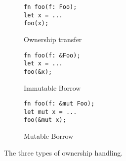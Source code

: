 \begin{figure}[ht]
  \begin{subfigure}{0.3\textwidth}
    \caption{Ownership transfer\label{fig:ownership-transfer}}
    \begin{lstlisting}
fn foo(f: Foo);
let x = ...
foo(x);\end{lstlisting}
  \end{subfigure}%
  \hfill
  \begin{subfigure}{0.3\textwidth}
    \caption{Immutable Borrow\label{fig:immutable-borrow}}
    \begin{lstlisting}
fn foo(f: &Foo);
let x = ...
foo(&x);\end{lstlisting}
  \end{subfigure}%
  \hfill
  \begin{subfigure}{0.3\textwidth}
    \caption{Mutable Borrow\label{fig:mutable-borrow}}
    \begin{lstlisting}
fn foo(f: &mut Foo);
let mut x = ...
foo(&mut x);\end{lstlisting}
  \end{subfigure}%
  \caption{The three types of ownership handling.\label{fig:rust-ownership}}
\end{figure}
